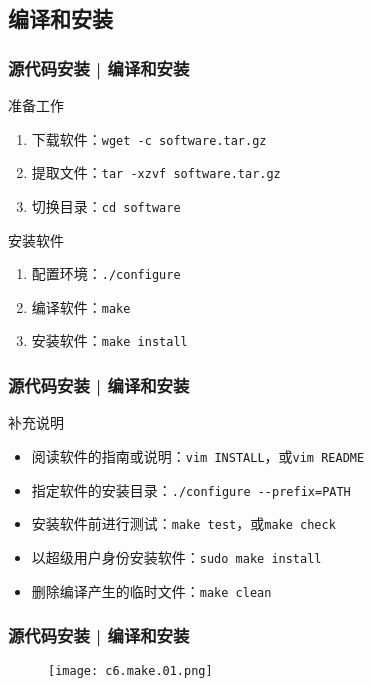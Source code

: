 \subsection{编译和安装}
\begin{frame}[fragile]
  \frametitle{源代码安装 | \alert{编译和安装}}
  \begin{block}{准备工作}
    \begin{enumerate}
      \item 下载软件：\verb|wget -c software.tar.gz|
      \item 提取文件：\verb|tar -xzvf software.tar.gz|
      \item 切换目录：\verb|cd software|
    \end{enumerate}
  \end{block}
  \pause
  \begin{block}{安装软件}
    \begin{enumerate}
      \item 配置环境：\verb|./configure|
      \item 编译软件：\verb|make|
      \item 安装软件：\verb|make install|
    \end{enumerate}
  \end{block}
\end{frame}

\begin{frame}[fragile]
  \frametitle{源代码安装 | 编译和安装}
  \begin{block}{补充说明}
    \begin{itemize}
      \item 阅读软件的指南或说明：\verb|vim INSTALL|，或\verb|vim README|
      \item 指定软件的安装目录：\verb|./configure --prefix=PATH|
      \item 安装软件前进行测试：\verb|make test|，或\verb|make check|
      \item 以超级用户身份安装软件：\verb|sudo make install|
      \item 删除编译产生的临时文件：\verb|make clean|
    \end{itemize}
  \end{block}
\end{frame}

\begin{frame}
  \frametitle{源代码安装 | 编译和安装}
  \begin{figure}
    \centering
    \texttt{[image: c6.make.01.png]}
  \end{figure}
\end{frame}

